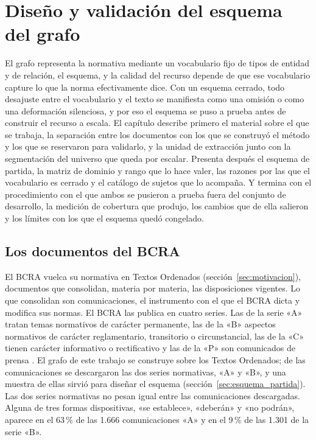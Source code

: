 \documentclass[12pt,a4paper]{report}
\begin{document}
\chapter{Diseño y validación del esquema del grafo}
\label{cap:esquema}

El grafo representa la normativa mediante un vocabulario fijo de tipos de entidad y de relación, el esquema, y la calidad del recurso depende de que ese vocabulario capture lo que la norma efectivamente dice. Con un esquema cerrado, todo desajuste entre el vocabulario y el texto se manifiesta como una omisión o como una deformación silenciosa, y por eso el esquema se puso a prueba antes de construir el recurso a escala. El capítulo describe primero el material sobre el que se trabaja, la separación entre los documentos con los que se construyó el método y los que se reservaron para validarlo, y la unidad de extracción junto con la segmentación del universo que queda por escalar. Presenta después el esquema de partida, la matriz de dominio y rango que lo hace valer, las razones por las que el vocabulario es cerrado y el catálogo de sujetos que lo acompaña. Y termina con el procedimiento con el que ambos se pusieron a prueba fuera del conjunto de desarrollo, la medición de cobertura que produjo, los cambios que de ella salieron y los límites con los que el esquema quedó congelado.

\section{Los documentos del BCRA}
\label{sec:docs_bcra}

El BCRA vuelca su normativa en Textos Ordenados (sección~\ref{sec:motivacion}), documentos que consolidan, materia por materia, las disposiciones vigentes. Lo que consolidan son comunicaciones, el instrumento con el que el BCRA dicta y modifica sus normas. El BCRA las publica en cuatro series. Las de la serie «A» tratan temas normativos de carácter permanente, las de la «B» aspectos normativos de carácter reglamentario, transitorio o circunstancial, las de la «C» tienen carácter informativo o rectificativo y las de la «P» son comunicados de prensa \cite{bcra2026comunicaciones}. El grafo de este trabajo se construye sobre los Textos Ordenados; de las comunicaciones se descargaron las dos series normativas, «A» y «B», y una muestra de ellas sirvió para diseñar el esquema (sección~\ref{sec:esquema_partida}). Las dos series normativas no pesan igual entre las comunicaciones descargadas. Alguna de tres formas dispositivas, «se establece», «deberán» y «no podrán», aparece en el 63\,\% de las 1.666 comunicaciones «A» y en el 9\,\% de las 1.301 de la serie «B».
\end{document}
